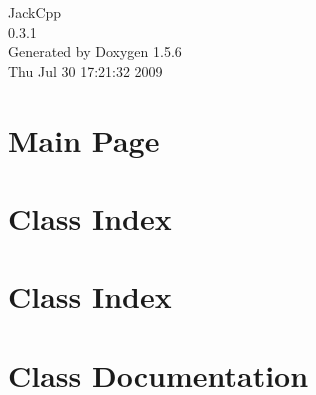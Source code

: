 \documentclass[a4paper]{book}
\begin{document}
\begin{titlepage}
\vspace*{7cm}
\begin{center}
{\Large JackCpp \\[1ex]\large 0.3.1 }\\
\vspace*{1cm}
{\large Generated by Doxygen 1.5.6}\\
\vspace*{0.5cm}
{\small Thu Jul 30 17:21:32 2009}\\
\end{center}
\end{titlepage}
\clearemptydoublepage
{}
\tableofcontents
\clearemptydoublepage
{}
\chapter{Main Page}
\label{index}
\chapter{Class Index}

\chapter{Class Index}

\chapter{Class Documentation}



\printindex
\end{document}
